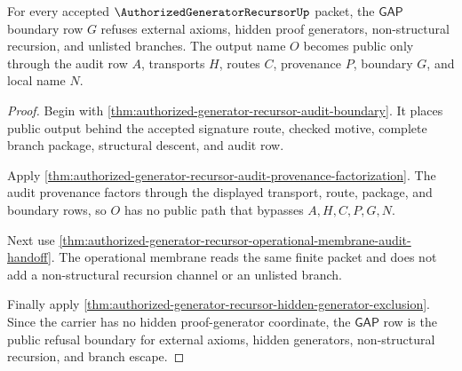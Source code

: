\begin{theorem}
\label{thm:authorized-generator-recursor-gap-boundary-refusal}
For every accepted $\AuthorizedGeneratorRecursorUp$ packet, the $\mathsf{GAP}$
boundary row $G$ refuses external axioms, hidden proof generators,
non-structural recursion, and unlisted branches. The output name $O$ becomes
public only through the audit row $A$, transports $H$, routes $C$, provenance
$P$, boundary $G$, and local name $N$.
\end{theorem}
\begin{proof}
Begin with \autoref{thm:authorized-generator-recursor-audit-boundary}. It
places public output behind the accepted signature route, checked motive,
complete branch package, structural descent, and audit row.

Apply
\autoref{thm:authorized-generator-recursor-audit-provenance-factorization}. The
audit provenance factors through the displayed transport, route, package, and
boundary rows, so $O$ has no public path that bypasses $A,H,C,P,G,N$.

Next use
\autoref{thm:authorized-generator-recursor-operational-membrane-audit-handoff}.
The operational membrane reads the same finite packet and does not add a
non-structural recursion channel or an unlisted branch.

Finally apply
\autoref{thm:authorized-generator-recursor-hidden-generator-exclusion}. Since
the carrier has no hidden proof-generator coordinate, the $\mathsf{GAP}$ row is
the public refusal boundary for external axioms, hidden generators,
non-structural recursion, and branch escape.
\end{proof}

